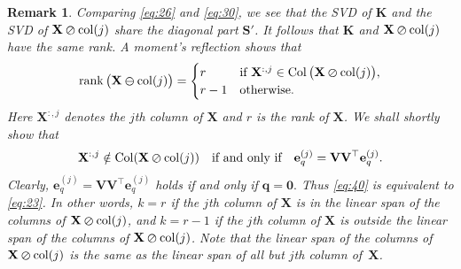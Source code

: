 \documentclass[11pt,a4paper]{article}
\theoremstyle{break}
\numberwithin{dummy}{section}
\theoremstyle{plain}
\theoremstyle{plain}
\theoremstyle{plain}
\theoremstyle{plain}
\theoremstyle{plain}
\newtheorem{remark}{Remark}[section]
\theoremstyle{MyNonumberplain}
\DeclareMathOperator*{\rk}{rank}
\DeclareMathOperator{\col}{Col}
\newcommand{\0}{\M{0}}
\newcommand{\M}[1]{\mathbf{#1}}
\newcommand{\T}{\top}
\newcommand{\ve}[1]{\mathbf{#1}}
\newcommand{\eve}[2]{\mathbf{e}^{(#1)}_{#2}}
\newcommand{\delcol}[2]{\M{#1} \varominus {\mathrm{col}}({#2})}
\newcommand{\zercol}[2]{\M{#1} \varoslash \mathrm{col}(#2)}
\begin{document}
\begin{remark}
  \label{rmk:2}
  Comparing \eqref{eq:26} and \eqref{eq:30}, we see that the SVD of $\M{K}$ and the SVD of $\zercol{X}{j}$ share the diagonal part $\M{S}'$.  It follows that $\M{K}$ and $\zercol{X}{j}$ have the same rank. A moment's reflection shows that
  \begin{equation}
    \label{eq:40}
    \rk \big( \delcol{X}{j} \big)  =
    \begin{cases}
      r & \text{if $\M{X}^{:,j} \in \col \big( \zercol{X}{j} \big)$},
      \\
      r - 1 & \text{otherwise}.
    \end{cases}
  \end{equation}
  Here $\M{X}^{:,j}$ denotes the $j$th column of $\M{X}$ and $r$ is the rank of $\M{X}$. We shall shortly show that
  \begin{align}
    \label{eq:41}
    \M{X}^{:,j} \notin \col (\zercol{X}{j})
    \quad
    \text{if and only if}
    \quad
    \eve{j}{q} = \M{V} \M{V}^\T \eve{j}{q}.
  \end{align}
  Clearly, $\eve{j}{q} = \M{V} \M{V}^\T \eve{j}{q}$ holds if and only if
  \begin{math}
    \ve{q} = \0.
  \end{math}
  Thus \eqref{eq:40}  is equivalent to \eqref{eq:23}. In other words, $k = r$ if the $j$th column of $\M{X}$ is in the linear span of the columns of $\zercol{X}{j}$, and $k = r-1$ if the $j$th column of $\M{X}$ is outside the linear span of the columns of $\zercol{X}{j}$. Note that the linear span of the columns of $\zercol{X}{j}$ is the same as the linear span of all but $j$th column of~$\M{X}$.


\end{remark}
\end{document}
